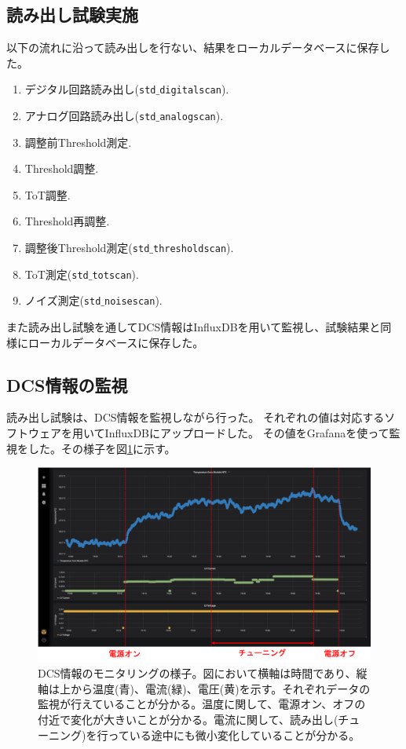 
\subsection{読み出し試験実施}
以下の流れに沿って読み出しを行ない、結果をローカルデータベースに保存した。
\begin{enumerate}
  \item デジタル回路読み出し(\texttt{std$\_$digitalscan}).
  \item アナログ回路読み出し(\texttt{std$\_$analogscan}).
  \item 調整前Threshold測定.
  \item Threshold調整.
  \item ToT調整.
  \item Threshold再調整.
  \item 調整後Threshold測定(\texttt{std$\_$thresholdscan}).
  \item ToT測定(\texttt{std$\_$totscan}).
  \item ノイズ測定(\texttt{std$\_$noisescan}).
\end{enumerate}

また読み出し試験を通してDCS情報はInfluxDBを用いて監視し、試験結果と同様にローカルデータベースに保存した。

\clearpage
\subsection{DCS情報の監視}
読み出し試験は、DCS情報を監視しながら行った。
それぞれの値は対応するソフトウェアを用いてInfluxDBにアップロードした。
その値をGrafanaを使って監視をした。その様子を図\ref{demo_monitor_dcs}に示す。

\begin{figure}[bpt]\centering
\includegraphics[width=15cm]{./demo_monitor_dcs.png}
\caption[DCS情報のモニタリングの様子]{DCS情報のモニタリングの様子。図において横軸は時間であり、縦軸は上から温度(青)、電流(緑)、電圧(黄)を示す。それぞれデータの監視が行えていることが分かる。温度に関して、電源オン、オフの付近で変化が大きいことが分かる。電流に関して、読み出し(チューニング)を行っている途中にも微小変化していることが分かる。}
\label{demo_monitor_dcs}
\end{figure}

